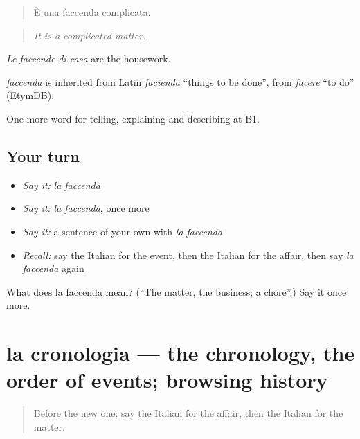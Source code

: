 \begin{quote}
È una faccenda complicata.
\end{quote}

\begin{quote}
\emph{It is a complicated matter.}
\end{quote}

\emph{Le faccende di casa} are the housework.

\begin{cousinweb}
\emph{faccenda} is inherited from Latin \emph{facienda} \textquotedblleft{}things to be done\textquotedblright{}, from \emph{facere} \textquotedblleft{}to do\textquotedblright{} (EtymDB).
\end{cousinweb}

\begin{grammarlens}[title={What you've built}]
One more word for telling, explaining and describing at B1.
\end{grammarlens}

\subsection*{Your turn}
\begin{itemize}
\raggedright
  \item \emph{Say it:} \emph{la faccenda}
  \item \emph{Say it:} \emph{la faccenda}, once more
  \item \emph{Say it:} a sentence of your own with \emph{la faccenda}
  \item \emph{Recall:} say the Italian for the event, then the Italian for the affair, then say \emph{la faccenda} again
\end{itemize}

\begin{tcolorbox}[breakable,colback=teal!4,colframe=teal!35!black,title={Before you move on}]
What does la faccenda mean? (\textquotedblleft{}The matter, the business; a chore\textquotedblright{}.) Say it once more.
\end{tcolorbox}
\section[la cronologia]{la cronologia — the chronology, the order of events; browsing history}

\label{lesson:IT-C276-cronologia}



\begin{quote}
Before the new one: say the Italian for the affair, then the Italian for the matter.
\end{quote}

